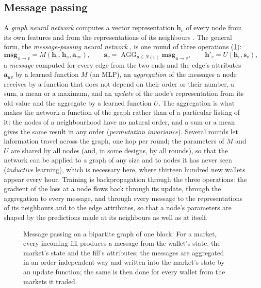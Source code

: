 \subsection{Message passing}
\label{sec:bg:gnn}

A \emph{graph neural network} computes a vector representation $\mathbf{h}_v$ of every
node from its own features and from the representations of its neighbours
\cite{scarselli2009gnn,micheli2009nn4g,kipf2017gcn,bacciu2020gentle}.  The general form,
the \emph{message-passing neural network} \cite{gilmer2017mpnn}, is one round of three
operations (\cref{fig:bg:mp}):
\begin{equation}
  \mathbf{msg}_{u \to v} = M(\mathbf{h}_v, \mathbf{h}_u, \mathbf{a}_{uv}), \qquad
  \mathbf{s}_v = \operatorname{AGG}_{u \in N(v)} \mathbf{msg}_{u \to v}, \qquad
  \mathbf{h}'_v = U(\mathbf{h}_v, \mathbf{s}_v),
  \label{eq:mpnn}
\end{equation}
a \emph{message} computed for every edge from the two ends and the edge's attributes
$\mathbf{a}_{uv}$ by a learned function $M$ (an MLP), an \emph{aggregation} of the
messages a node receives by a function that does not depend on their order or their
number, a sum, a mean or a maximum, and an \emph{update} of the node's representation
from its old value and the aggregate by a learned function $U$.  The aggregation is what
makes the network a function of the graph rather than of a particular listing of it: the
nodes of a neighbourhood have no natural order, and a sum or a mean gives the same result
in any order (\emph{permutation invariance}).  Several rounds let information travel
across the graph, one hop per round; the parameters of $M$ and $U$ are shared by all nodes
(and, in some designs, by all rounds), so that the network can be applied to a graph of
any size and to nodes it has never seen (\emph{inductive} learning), which is necessary
here, where thirteen hundred new wallets appear every hour.  Training is backpropagation
through the three operations: the gradient of the loss at a node flows back through its
update, through the aggregation to every message, and through every message to the
representations of its neighbours and to the edge attributes, so that a node's parameters
are shaped by the predictions made at its neighbours as well as at itself.

\begin{figure}[t]
\centering
\resizebox{\textwidth}{!}{}
\caption{Message passing on a bipartite graph of one block.  For a market, every incoming
fill produces a message from the wallet's state, the market's state and the fill's
attributes; the messages are aggregated in an order-independent way and written into the
market's state by an update function; the same is then done for every wallet from the
markets it traded.}
\label{fig:bg:mp}
\end{figure}

